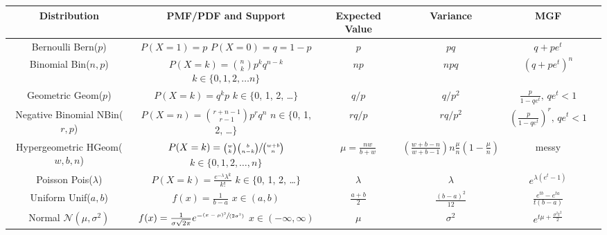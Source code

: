 \documentclass[6pt,landscape]{article}
\renewcommand{\N}{\mathcal{N}}
\newcommand{\Bern}{\textrm{Bern}}
\newcommand{\Bin}{\textrm{Bin}}
\newcommand{\Pois}{\textrm{Pois}}
\newcommand{\Unif}{\textrm{Unif}}
\newcommand{\Geom}{\textrm{Geom}}
\newcommand{\NBin}{\textrm{NBin}}
\newcommand{\Hypergeometric}{\textrm{HGeom}}
\begin{document}
\begin{center}
\renewcommand{\arraystretch}{3.7}
\begin{tabular}{cccccc}
\textbf{Distribution} & \textbf{PMF/PDF and Support} & \textbf{Expected Value}  & \textbf{Variance} & \textbf{MGF}\\
\hline 
\shortstack{Bernoulli \\ \Bern($p$)} & \shortstack{$P(X=1) = p$ \\$ P(X=0) = q=1-p$} & $p$ & $pq$ & $q + pe^t$ \\
\hline
\shortstack{Binomial \\ \Bin($n, p$)} & \shortstack{$P(X=k) = {n \choose k}p^k q^{n-k}$  \\ $k \in \{0, 1, 2, \dots n\}$}& $np$ & $npq$ & $(q + pe^t)^n$ \\
\hline
\shortstack{Geometric \\ \Geom($p$)} & \shortstack{$P(X=k) = q^kp$  \\ $k \in \{$0, 1, 2, \dots $\}$}& $q/p$ & $q/p^2$ & $\frac{p}{1-qe^t}, \, qe^t < 1$\\
\hline
\shortstack{Negative Binomial \\ \NBin($r, p$)} & \shortstack{$P(X=n) = {r + n - 1 \choose r -1}p^rq^n$ \\ $n \in \{$0, 1, 2, \dots $\}$} & $rq/p$ & $rq/p^2$ &  $(\frac{p}{1-qe^t})^r, \, qe^t < 1$\\
\hline
\shortstack{Hypergeometric \\ \Hypergeometric($w, b, n$)} & \shortstack{$P(X=k) = \sfrac{{w \choose k}{b \choose n-k}}{{w + b \choose n}}$ \\ $k \in \{0, 1, 2, \dots,  n\}$} & $\mu = \frac{nw}{b+w}$ &$\left(\frac{w+b-n}{w+b-1} \right) n\frac{\mu}{n}(1 - \frac{\mu}{n})$& messy  \\
\hline
\shortstack{Poisson \\ \Pois($\lambda$)} & \shortstack{$P(X=k) = \frac{e^{-\lambda}\lambda^k}{k!}$ \\ $k \in \{$0, 1, 2, \dots $\}$} & $\lambda$ & $\lambda$ & $e^{\lambda(e^t-1)}$ \\
\hline
\hline
\shortstack{Uniform \\ \Unif($a, b$)} & \shortstack{$ f(x) = \frac{1}{b-a}$ \\$ x \in (a, b) $} & $\frac{a+b}{2}$ & $\frac{(b-a)^2}{12}$ &  $\frac{e^{tb}-e^{ta}}{t(b-a)}$\\
\hline
\shortstack{Normal \\ $\N(\mu, \sigma^2)$} & \shortstack{$f(x) = \frac{1}{\sigma \sqrt{2\pi}} e^{-\sfrac{(x - \mu)^2}{(2 \sigma^2)}}$ \\ $x \in (-\infty, \infty)$} & $\mu$  & $\sigma^2$ & $e^{t\mu + \frac{\sigma^2t^2}{2}}$\\

\end{tabular}
\end{center}
\end{document}

